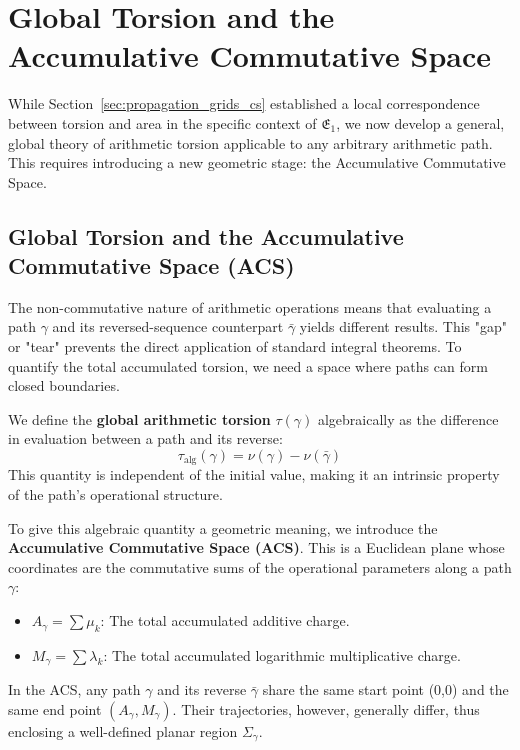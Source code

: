 \documentclass[12pt]{article}
\begin{document}
\section{Global Torsion and the Accumulative Commutative Space}\label{sec:global_torsion_cs}

While Section~\ref{sec:propagation_grids_cs} established a local correspondence between torsion and area in the specific context of \( \mathfrak{E}_1 \), we now develop a general, global theory of arithmetic torsion applicable to any arbitrary arithmetic path. This requires introducing a new geometric stage: the Accumulative Commutative Space.

\subsection{Global Torsion and the Accumulative Commutative Space (ACS)}

The non-commutative nature of arithmetic operations means that evaluating a path \( \gamma \) and its reversed-sequence counterpart \( \bar{\gamma} \) yields different results. This "gap" or "tear" prevents the direct application of standard integral theorems. To quantify the total accumulated torsion, we need a space where paths can form closed boundaries.

We define the \textbf{global arithmetic torsion} \( \tau(\gamma) \) algebraically as the difference in evaluation between a path and its reverse:
\begin{equation}
\tau_{\text{alg}}(\gamma) = \nu(\gamma) - \nu(\bar{\gamma})
\label{eq:T_alg_formal_cs}
\end{equation}
This quantity is independent of the initial value, making it an intrinsic property of the path's operational structure.

To give this algebraic quantity a geometric meaning, we introduce the \textbf{Accumulative Commutative Space (ACS)}. This is a Euclidean plane whose coordinates are the commutative sums of the operational parameters along a path \( \gamma \):
\begin{itemize}
    \item \( A_\gamma = \sum \mu_k \): The total accumulated additive charge.
    \item \( M_\gamma = \sum \lambda_k \): The total accumulated logarithmic multiplicative charge.
\end{itemize}
In the ACS, any path \( \gamma \) and its reverse \( \bar{\gamma} \) share the same start point (0,0) and the same end point \( (A_\gamma, M_\gamma) \). Their trajectories, however, generally differ, thus enclosing a well-defined planar region \( \Sigma_\gamma \).
\end{document}
